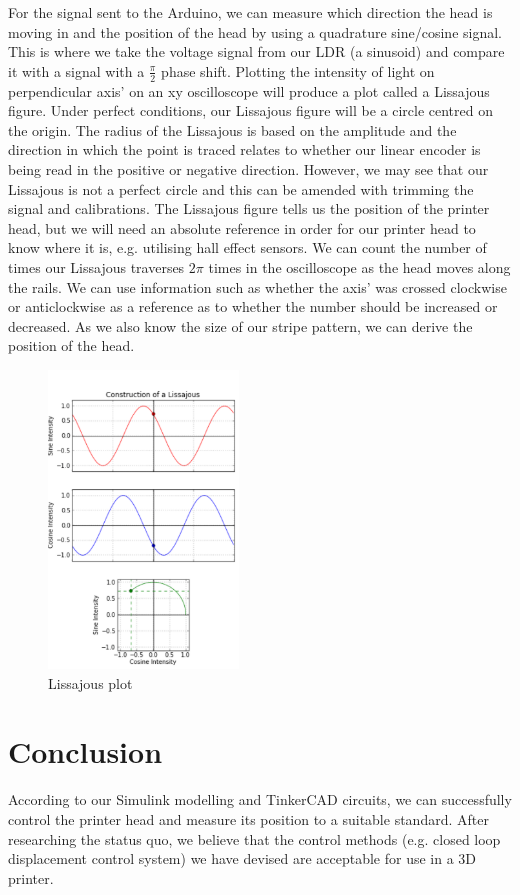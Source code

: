 \documentclass[conference]{IEEEtran}
\begin{document}
For the signal sent to the Arduino, we can measure which direction the head is moving in and the position of the head by using a quadrature sine/cosine signal. This is where we take the voltage signal from our LDR (a sinusoid) and compare it with a signal with a $\frac{\pi}{2}$ phase shift. Plotting the intensity of light on perpendicular axis' on an xy oscilloscope will produce a plot called a Lissajous figure. Under perfect conditions, our Lissajous figure will be a circle centred on the origin. The radius of the Lissajous is based on the amplitude and the direction in which the point is traced relates to whether our linear encoder is being read in the positive or negative direction. However, we may see that our Lissajous is not a perfect circle and this can be amended with trimming the signal and calibrations. The Lissajous figure tells us the position of the printer head, but we will need an absolute reference in order for our printer head to know where it is, e.g. utilising hall effect sensors. We can count the number of times our Lissajous traverses $2\pi$ times in the oscilloscope as the head moves along the rails. We can use information such as whether the axis' was crossed clockwise or anticlockwise as a reference as to whether the number should be increased or decreased. As we also know the size of our stripe pattern, we can derive the position of the head.
\begin{figure}[htbp]
    \centerline{\includegraphics[width = 0.45\textwidth]{../img/Lissajous1.png}}
    \caption{Lissajous plot}
\end{figure}

\section*{Conclusion}
According to our Simulink modelling and TinkerCAD circuits, we can successfully control the printer head and measure its position to a suitable standard. After researching the status quo, we believe that the control methods (e.g. closed loop displacement control system) we have devised are acceptable for use in a 3D printer.
\end{document}
